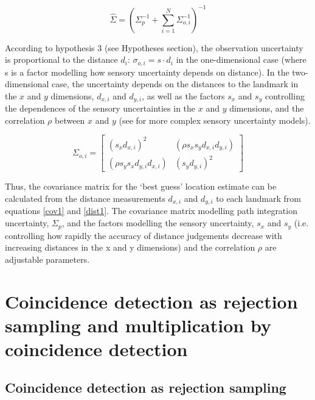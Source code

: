 \begin{equation}\label{cov1}
\hat { \Sigma  } =(\Sigma_p ^{ -1 }+\sum _{ i=1 }^{ N }{ \Sigma _{ o,i }^{ -1 } } )^{ -1 }
\end{equation}

According to hypothesis 3 (see Hypotheses section), the observation uncertainty is proportional to the distance $ d_i $: $ \sigma_{o,i} = s \cdot d_i $ in the one-dimensional case (where s is a factor modelling how sensory uncertainty depends on distance). In the two-dimensional case, the uncertainty depends on the distances to the landmark in the $ x $ and $ y $ dimensions, $ d_{x, i} $ and $ d_{y, i} $, as well as the factors $ s_x $ and $ s_y $ controlling the dependences of the sensory uncertainties in the $ x $ and $ y $ dimensions, and the correlation $ \rho $ between $x$ and $y$ (see \citep{Negenborn2003, Thrun2005} for more complex sensory uncertainty models).

\begin{equation}\label{dist1}
\Sigma_{o, i} = \begin{bmatrix} (s_x  d_{x, i})^2  & (\rho s_x  s_y  d_{x, i}  d_{y, i})  \\ (\rho s_y s_x  d_{y, i}  d_{x, i})  & (s_y  d_{y, i})^2  \end{bmatrix}
\end{equation}

Thus, the covariance matrix for the `best guess' location estimate can be calculated from the distance measurements $ d_{x, i} $ and $ d_{y, i} $ to each landmark from equations \eqref{cov1} and \eqref{dist1}. The covariance matrix modelling path integration uncertainty, $ \Sigma_p $, and the factors modelling the sensory uncertainty, $s_x$ and $s_y$ (i.e. controlling how rapidly the accuracy of distance judgements decrease with increasing distances in the x and y dimensions) and the correlation $\rho$ are adjustable parameters.



\section{Coincidence detection as rejection sampling and multiplication by coincidence detection}

\subsection*{Coincidence detection as rejection sampling}

